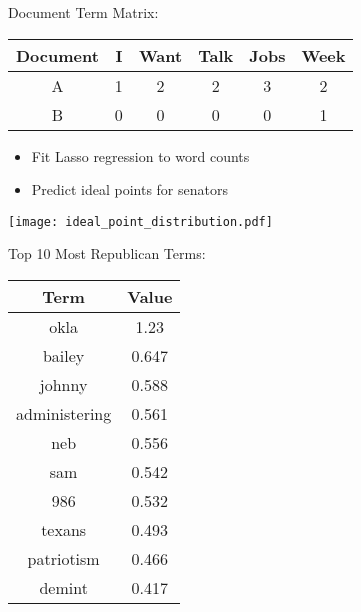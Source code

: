 \documentclass[xcolor=pdftex,dvipsnames,table]{beamer}
\begin{document}
\frame
{
	Document Term Matrix:
	\begin{table}[htdp]
	\begin{center}
	\begin{tabular}{|c|c|c|c|c|c|}
	\hline
	Document & I & Want & Talk & Jobs & Week \\
	\hline
	A & 1 & 2 & 2 & 3 & 2 \\
	B & 0 & 0 & 0 & 0 & 1 \\
	\hline
	\end{tabular}
	\end{center}
	\end{table}
}

\frame
{
	\begin{itemize}
		\item{Fit Lasso regression to word counts}
		\item{Predict ideal points for senators}
	\end{itemize}
}

\frame
{
	\begin{center}
		\texttt{[image: ideal\_point\_distribution.pdf]}
	\end{center}
}

\frame
{
	Top 10 Most Republican Terms:
	\begin{table}[htdp]
	\begin{center}
	\begin{tabular}{|c|c|}
	\hline
	Term & Value \\ 
	\hline
	okla & 1.23 \\
	bailey & 0.647 \\
	johnny & 0.588 \\
	administering & 0.561 \\
	neb & 0.556 \\
	sam & 0.542 \\
	986 & 0.532 \\
	texans & 0.493 \\
	patriotism & 0.466 \\
	demint & 0.417 \\
	\hline
	\end{tabular}
	\end{center}
	\label{default}
	\end{table}
}
\end{document}
